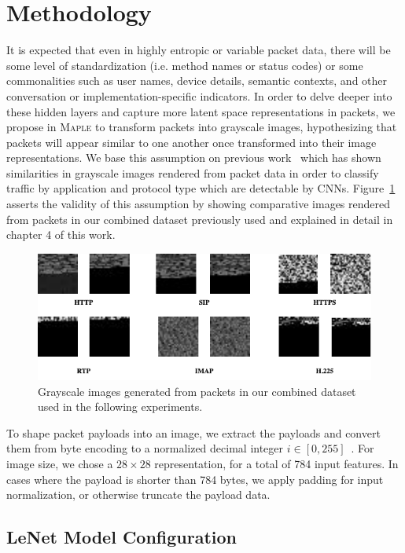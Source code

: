 \section{Methodology}

It is expected that even in highly entropic or variable packet data, there will be some level of standardization (i.e. method names or status codes) or some commonalities such as user names, device details, semantic contexts, and other conversation or implementation-specific indicators. In order to delve deeper into these hidden layers and capture more latent space representations in packets, we propose in \textsc{Maple} to transform packets into grayscale images, hypothesizing that packets will appear similar to one another once transformed into their image representations. We base this assumption on previous work~\cite{lim2019network} which has shown similarities in grayscale images rendered from packet data in order to classify traffic by application and protocol type which are detectable by CNNs. Figure~\ref{fig:grayscale} asserts the validity of this assumption by showing comparative images rendered from packets in our combined dataset previously used and explained in detail in chapter 4 of this work.

\begin{figure} [ht!]
\includegraphics[width=\linewidth]{chapters/5/img/grayscaleimages.drawio.png}
\caption{Grayscale images generated from packets in our combined dataset used in the following experiments.}
\label{fig:grayscale}
\end{figure}

To shape packet payloads into an image, we extract the payloads and convert them from byte encoding to a normalized decimal integer $i \in [0,255]$~\cite{jo2020packet}. For image size, we chose a $28\times28$ representation, for a total of 784 input features. In cases where the payload is shorter than 784 bytes, we apply padding for input normalization, or otherwise truncate the payload data.

\subsection{LeNet Model Configuration}

